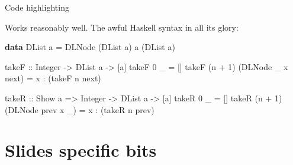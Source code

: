 \documentclass[10pt,compress]{beamer}
\makeatletter
\let\OldHref\href
\renewcommand{\href}[2]{\OldHref[pdfnewwindow]{#1}{{\textbf{#2}}}}
\newenvironment{Shaded}{\vspace{\baselineskip}\begin{shaded}}{\end{shaded}\vspace{\baselineskip}}
\newcommand{\KeywordTok}[1]{\textcolor{solarized@base00}{\textbf{#1}}}
\newcommand{\DataTypeTok}[1]{\textcolor{solarized@blue}{#1}}
\newcommand{\DecValTok}[1]{\textcolor{solarized@violet}{#1}}
\newcommand{\OtherTok}[1]{\textcolor{solarized@green}{#1}}
\newcommand{\FunctionTok}[1]{\textcolor{solarized@base1}{#1}}
\newcommand{\NormalTok}[1]{\textcolor{solarized@base00}{#1}}
\makeatother
\begin{document}
\begin{frame}[fragile]{Code highlighting}

Works reasonably well. The awful Haskell syntax in all its glory:

\begin{Shaded}
\begin{Highlighting}[]
\KeywordTok{data} \DataTypeTok{DList} \NormalTok{a }\FunctionTok{=} \DataTypeTok{DLNode} \NormalTok{(}\DataTypeTok{DList} \NormalTok{a) a (}\DataTypeTok{DList} \NormalTok{a)}

\OtherTok{takeF ::} \DataTypeTok{Integer} \OtherTok{->} \DataTypeTok{DList} \NormalTok{a }\OtherTok{->} \NormalTok{[a]}
\NormalTok{takeF }\DecValTok{0}     \NormalTok{_                   }\FunctionTok{=} \NormalTok{[]}
\NormalTok{takeF (n }\FunctionTok{+} \DecValTok{1}\NormalTok{) (}\DataTypeTok{DLNode} \NormalTok{_ x next) }\FunctionTok{=} \NormalTok{x }\FunctionTok{:} \NormalTok{(takeF n next)}

\OtherTok{takeR ::} \DataTypeTok{Show} \NormalTok{a }\OtherTok{=>} \DataTypeTok{Integer} \OtherTok{->} \DataTypeTok{DList} \NormalTok{a }\OtherTok{->} \NormalTok{[a]}
\NormalTok{takeR }\DecValTok{0}     \NormalTok{_                   }\FunctionTok{=} \NormalTok{[]}
\NormalTok{takeR (n }\FunctionTok{+} \DecValTok{1}\NormalTok{) (}\DataTypeTok{DLNode} \NormalTok{prev x _) }\FunctionTok{=} \NormalTok{x }\FunctionTok{:} \NormalTok{(takeR n prev)}
\end{Highlighting}
\end{Shaded}

\end{frame}


\section{Slides specific bits}\label{slides-specific-bits}
\end{document}

